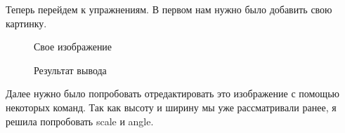 \documentclass[
  english,
  russian,
  12pt,
  a4paper,
  DIV=11,
  numbers=noendperiod]{scrreprt}
\begin{document}
Теперь перейдем к упражнениям. В первом нам нужно было добавить свою
картинку.

\begin{figure}


\caption{\label{fig-017}Свое изображение}

\end{figure}%

\begin{figure}


\caption{\label{fig-018}Результат вывода}

\end{figure}%

Далее нужно было попробовать отредактировать это изображение с помощью
некоторых команд. Так как высоту и ширину мы уже рассматривали ранее, я
решила попробовать scale и angle.
\end{document}
